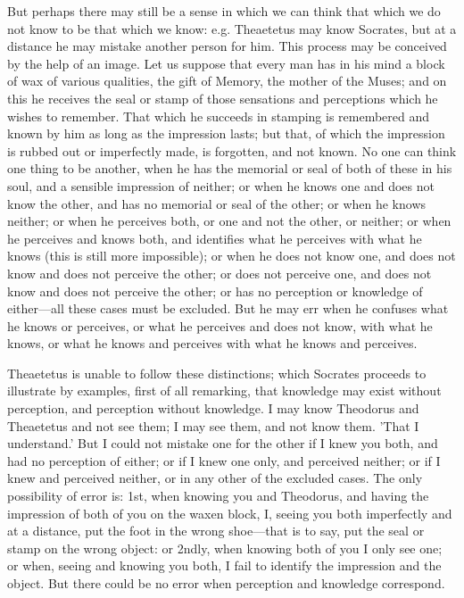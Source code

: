 \documentclass[11pt,letter]{article}
\begin{document}
\par  But perhaps there may still be a sense in which we can think that which we do not know to be that which we know: e.g. Theaetetus may know Socrates, but at a distance he may mistake another person for him. This process may be conceived by the help of an image. Let us suppose that every man has in his mind a block of wax of various qualities, the gift of Memory, the mother of the Muses; and on this he receives the seal or stamp of those sensations and perceptions which he wishes to remember. That which he succeeds in stamping is remembered and known by him as long as the impression lasts; but that, of which the impression is rubbed out or imperfectly made, is forgotten, and not known. No one can think one thing to be another, when he has the memorial or seal of both of these in his soul, and a sensible impression of neither; or when he knows one and does not know the other, and has no memorial or seal of the other; or when he knows neither; or when he perceives both, or one and not the other, or neither; or when he perceives and knows both, and identifies what he perceives with what he knows (this is still more impossible); or when he does not know one, and does not know and does not perceive the other; or does not perceive one, and does not know and does not perceive the other; or has no perception or knowledge of either—all these cases must be excluded. But he may err when he confuses what he knows or perceives, or what he perceives and does not know, with what he knows, or what he knows and perceives with what he knows and perceives.

\par  Theaetetus is unable to follow these distinctions; which Socrates proceeds to illustrate by examples, first of all remarking, that knowledge may exist without perception, and perception without knowledge. I may know Theodorus and Theaetetus and not see them; I may see them, and not know them. 'That I understand.' But I could not mistake one for the other if I knew you both, and had no perception of either; or if I knew one only, and perceived neither; or if I knew and perceived neither, or in any other of the excluded cases. The only possibility of error is: 1st, when knowing you and Theodorus, and having the impression of both of you on the waxen block, I, seeing you both imperfectly and at a distance, put the foot in the wrong shoe—that is to say, put the seal or stamp on the wrong object: or 2ndly, when knowing both of you I only see one; or when, seeing and knowing you both, I fail to identify the impression and the object. But there could be no error when perception and knowledge correspond.
\end{document}
